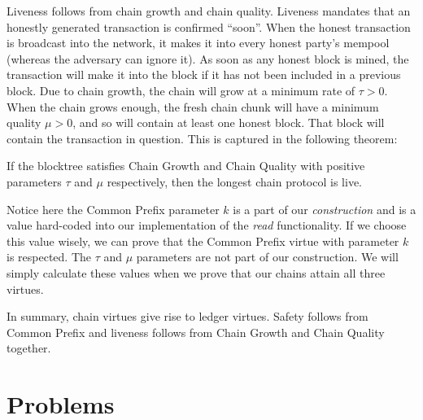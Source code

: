 Liveness follows from chain growth and chain quality.
Liveness mandates that an honestly generated transaction is confirmed ``soon''.
When the honest transaction is broadcast into the network, it makes it into every
honest party's mempool (whereas the adversary can ignore it). As soon as any honest
block is mined, the transaction will make it into the block if it has not been
included in a previous block. Due to chain growth, the chain will grow at a minimum
rate of $\tau > 0$. When the chain grows enough, the fresh chain chunk will have a minimum
quality $\mu > 0$, and so will contain at least one honest block. That block will
contain the transaction in question. This is captured in the following theorem:

\begin{theorem}
    If the blocktree satisfies Chain Growth and Chain Quality with positive parameters $\tau$
    and $\mu$ respectively, then the longest chain protocol is live.
\end{theorem}

Notice here the Common Prefix parameter $k$ is a part of our \emph{construction} and is a value
hard-coded into our implementation of the \emph{read} functionality. If we choose this value
wisely, we can prove that the Common Prefix virtue with parameter $k$ is respected. The $\tau$
and $\mu$ parameters are not part of our construction. We will simply calculate these values
when we prove that our chains attain all three virtues.

In summary, chain virtues give rise to ledger virtues. Safety follows from Common Prefix
and liveness follows from Chain Growth and Chain Quality together.

\section*{Problems}


